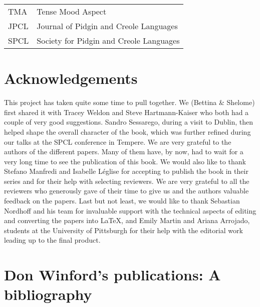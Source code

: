 \documentclass[output=paper, colorlinks,citecolor=brown]{langscibook}
\begin{document}
\begin{tabular}{@{}ll@{}}
TMA  & Tense Mood Aspect\\
JPCL & Journal of Pidgin and Creole Languages \\
SPCL & Society for Pidgin and Creole Languages \\
\end{tabular}

\section*{Acknowledgements}

This project has taken quite some time to pull together. We (Bettina \& Shelome) first shared it with Tracey Weldon and Steve Hartmann-Kaiser who both had a couple of very good suggestions. Sandro Sessarego, during a visit to Dublin, then helped shape the overall character of the book, which was further refined during our talks at the SPCL conference in Tempere. We are very grateful to the authors of the different papers. Many of them have, by now, had to wait for a very long time to see the publication of this book. We would also like to thank Stefano Manfredi and Isabelle Léglise for accepting to publish the book in their series and for their help with selecting reviewers. We are very grateful to all the reviewers who generously gave of their time to give us and the authors valuable feedback on the papers. Last but not least, we would like to thank Sebastian Nordhoff and his team for invaluable support with the technical aspects of editing and converting the papers into \LaTeX, and Emily Martin and Ariana Arrojado, students at the University of Pittsburgh for their help with the editorial work leading up to the final product.


\printbibliography[heading=subbibliography,notkeyword=Winford]

\section*{Don Winford’s publications: A bibliography}
\end{document}
